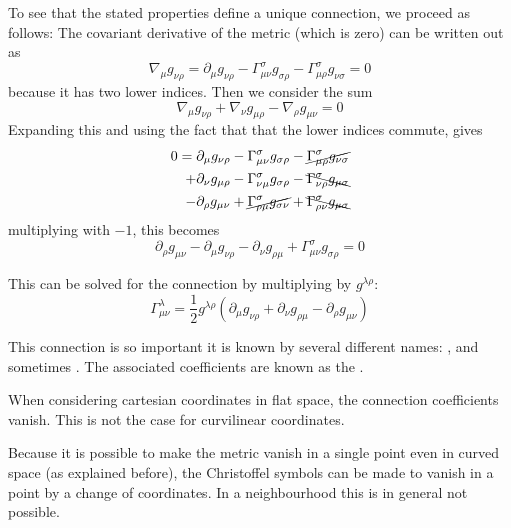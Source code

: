 To see that the stated properties define a unique connection, we proceed as follows:
The covariant derivative of the metric (which is zero) can be written out as
\[ \nabla_\mu g_{\nu\rho} = \partial_\mu g_{\nu\rho} - \Gamma_{\mu\nu}^\sigma g_{\sigma\rho} - \Gamma_{\mu\rho}^\sigma g_{\nu\sigma} = 0 \]
because it has two lower indices. Then we consider the sum
\[ \nabla_\mu g_{\nu\rho} + \nabla_\nu g_{\mu\rho} - \nabla_\rho g_{\mu\nu} = 0 \]
Expanding this and using the fact that that the lower indices commute, gives
\begin{align}
0 = {} &\partial_\mu g_{\nu\rho} - \Gamma_{\mu\nu}^\sigma g_{\sigma\rho} - \cancel{\Gamma_{\mu\rho}^\sigma g_{\nu\sigma}} \\
+ &\partial_\nu g_{\mu\rho} - \Gamma_{\nu\mu}^\sigma g_{\sigma\rho} - \bcancel{\Gamma_{\nu\rho}^\sigma g_{\mu\sigma}} \\
- &\partial_\rho g_{\mu\nu} + \cancel{\Gamma_{\rho\mu}^\sigma g_{\sigma\nu}} + \bcancel{\Gamma_{\rho\nu}^\sigma g_{\mu\sigma}}
\end{align}
multiplying with $-1$, this becomes
\[ \partial_{\rho}g_{\mu\nu} - \partial_{\mu}g_{\nu\rho} - \partial_{\nu}g_{\rho\mu} + \Gamma_{\mu\nu}^\sigma g_{\sigma\rho} = 0 \]

This can be solved for the connection by multiplying by $g^{\lambda\rho}$:
\[ \boxed{\Gamma^\lambda_{\mu\nu} = \frac{1}{2}g^{\lambda\rho}\left(\partial_\mu g_{\nu\rho} + \partial_\nu g_{\rho\mu}-\partial_\rho g_{\mu\nu}\right)} \]

This connection is so important it is known by several different names: ,  and sometimes . The associated coefficients are known as the .

When considering cartesian coordinates in flat space, the connection coefficients vanish. This is not the case for curvilinear coordinates.

Because it is possible to make the metric vanish in a single point even in curved space (as explained before), the Christoffel symbols can be made to vanish in a point by a change of coordinates. In a neighbourhood this is in general not possible.

